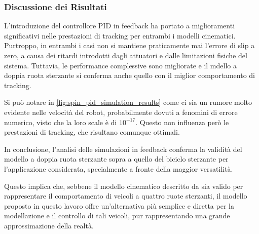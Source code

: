 \subsubsection{Discussione dei Risultati}
L'introduzione del controllore PID in feedback ha portato a miglioramenti significativi nelle prestazioni di tracking per entrambi i modelli cinematici. Purtroppo, in entrambi i casi non si mantiene praticamente mai l'errore di slip a zero, a causa dei ritardi introdotti dagli attuatori e dalle limitazioni fisiche del sistema. Tuttavia, le performance complessive sono migliorate e il mdello a doppia ruota sterzante si conferma anche quello con il miglior comportamento di tracking.
\begin{note}
    Si può notare in \cref{fig:spin_pid_simulation_results} come ci sia un rumore molto evidente nelle velocità del robot, probabilmente dovuti a fenomini di errore numerico, visto che la loro scale è di $10^{-17}$. Questo non influenza però le prestazioni di tracking, che risultano comunque ottimali.
\end{note}
In conclusione, l'analisi delle simulazioni in feedback conferma la validità del modello a doppia ruota sterzante sopra a quello del biciclo sterzante per l'applicazione considerata, specialmente a fronte della maggior versatilità.

Questo implica che, sebbene il modello cinematico descritto da \cite{tourajizadeh2020fourwheel} sia valido per rappresentare il comportamento di veicoli a quattro ruote sterzanti, il modello proposto in questo lavoro offre un'alternativa più semplice e diretta per la modellazione e il controllo di tali veicoli, pur rappresentando una grande approssimazione della realtà.
